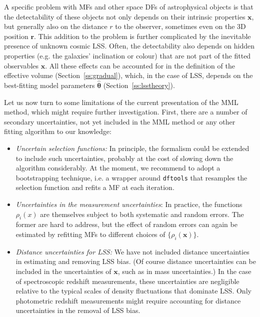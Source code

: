 \documentclass[a4paper,fleqn,usenatbib]{mnras}
\newcommand{\bi}{\begin{itemize}[leftmargin=3.5mm]\setlength{\itemindent}{-1.6mm}}
\newcommand{\ei}{\end{itemize}}
\renewcommand{\r}{\mathbf{r}}
\newcommand{\dftools}{\texttt{dftools}\xspace}
\newcommand{\x}{\mathbf{x}}
\renewcommand{\ss}[1]{Section~\ref{ss:#1}}
\newcommand{\ie}{i.e.\xspace}
\newcommand{\eg}{e.g.\xspace}
\newcommand{\para}{{\bm{\theta}}}
\begin{document}
A specific problem with MFs and other space DFs of astrophysical objects is that the detectability of these objects not only depends on their intrinsic properties $\x$, but generally also on the distance $r$ to the observer, sometimes even on the 3D position $\r$. This addition to the problem is further complicated by the inevitable presence of unknown cosmic LSS. Often, the detectability also depends on hidden properties (\eg the galaxies' inclination or colour) that are not part of the fitted observables $\x$. All these effects can be accounted for in the definition of the effective volume (\ss{gradual}), which, in the case of LSS, depends on the best-fitting model parameters $\hat\para$ (\ss{lsstheory}).

Let us now turn to some limitations of the current presentation of the MML method, which might require further investigation. First, there are a number of secondary uncertainties, not yet included in the MML method or any other fitting algorithm to our knowledge:
%
\bi
\item \textit{Uncertain selection functions:} In principle, the formalism could be extended to include such uncertainties, probably at the cost of slowing down the algorithm considerably. At the moment, we recommend to adopt a bootstrapping technique, \ie a wrapper around \dftools that resamples the selection function and refits a MF at each iteration.
\item \textit{Uncertainties in the measurement uncertainties}: In practice, the functions $\rho_i(x)$ are themselves subject to both systematic and random errors. The former are hard to address, but the effect of random errors can again be estimated by refitting MFs to different choices of $\{\rho_i(\x)\}$.
\item \textit{Distance uncertainties for LSS:} We have not included distance uncertainties in estimating and removing LSS bias. (Of course distance uncertainties can be included in the uncertainties of $\x$, such as in mass uncertainties.) In the case of spectroscopic redshift measurements, these uncertainties are negligible relative to the typical scales of density fluctuations that dominate LSS. Only photometric redshift measurements might require accounting for distance uncertainties in the removal of LSS bias.
\ei
\end{document}
